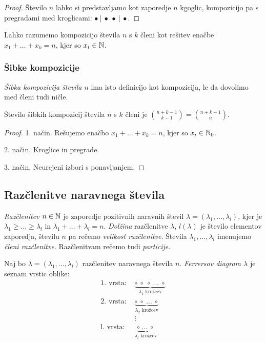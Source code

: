 \begin{proof}
    Število $n$ lahko si predstavljamo kot zaporedje $n$ kgoglic, kompozicijo pa s pregradami med kroglicami: $\bullet~|~\bullet~\bullet~|~\bullet$.
\end{proof}

\begin{opomba}
    Lahko razumemo kompozicijo števila $n$ s $k$ členi kot rešitev enačbe $x_1 + \ldots + x_k = n$, kjer so $x_i \in \mathbb{N}$.
\end{opomba}

\subsubsection{Šibke kompozicije}
\begin{definicija}
    \emph{Šibka kompozicija števila $n$} ima isto definicijo kot kompozicija, le da dovolimo med členi tudi ničle.
\end{definicija}

\begin{trditev}
    Število šibkih kompozicij števila $n$ s $k$ členi je $\binom{n+k-1}{k-1} = \binom{n+k-1}{n}$.
\end{trditev}

\begin{proof}
    1. način. Rešujemo enačbo $x_1 + \ldots + x_k = n$, kjer so $x_i \in \mathbb{N}_0$.

    2. način. Kroglice in pregrade.

    3. način. Neurejeni izbori s ponavljanjem.
\end{proof}

\subsection{Razčlenitve naravnega števila}
\begin{definicija}
    \emph{Razčlenitev $n \in \mathbb{N}$} je zaporedje pozitivnih naravnih števil $\lambda = (\lambda_1, \ldots, \lambda_l)$, kjer je $\lambda_1 \geq \ldots \geq \lambda_l$ in $\lambda_1 + \ldots + \lambda_l = n$. \emph{Dolžina} razčlenitve $\lambda$, $l(\lambda)$ je število elementov zaporedja, številu $n$ pa rečemo \emph{velikost razčlenitve}. Števila $\lambda_1, \ldots, \lambda_l$ imenujemo \emph{členi razčlenitve}. Razčlenitvam rečemo tudi \emph{particije}.
\end{definicija}

\begin{definicija}
    Naj bo $\lambda = (\lambda_1, \ldots, \lambda_l)$ razčlenitev naravnega števila $n$. \emph{Ferrersov diagram $\lambda$} je seznam vrstic oblike:
    \begin{align*}
        \text{1. vrsta: } &\underbrace{\circ \ \circ \ \circ \ \ldots \ \circ}_{\lambda_1 \text{ krožcev}} \\
        \text{2. vrsta: } &\underbrace{\circ \ \circ \ \ldots \ \circ}_{\lambda_2 \text{ krožcev}} \\
        &\vdots \\
        \text{l. vrsta: } &\underbrace{\circ \ \ldots \ \circ}_{\lambda_l \text{ krožcev}}
    \end{align*}
\end{definicija}

